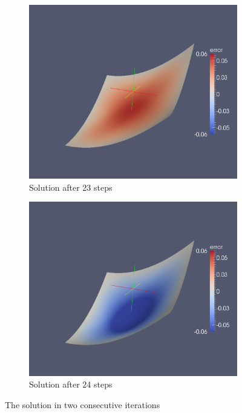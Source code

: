 \begin{figure}[h]
\begin{subfigure}[b]{.5\textwidth}
	\includegraphics[width=1.\textwidth]{plots/with_penalty_it22.pdf}
	\caption{Solution after 23 steps}
\end{subfigure}
\begin{subfigure}[b]{.5\textwidth}
	\includegraphics[width=1.\textwidth]{plots/with_penalty_it23.pdf}
	\caption{Solution after 24 steps}
\end{subfigure}
\caption{The solution in two consecutive iterations}
\label{fig: diff iteration}
\end{figure}

